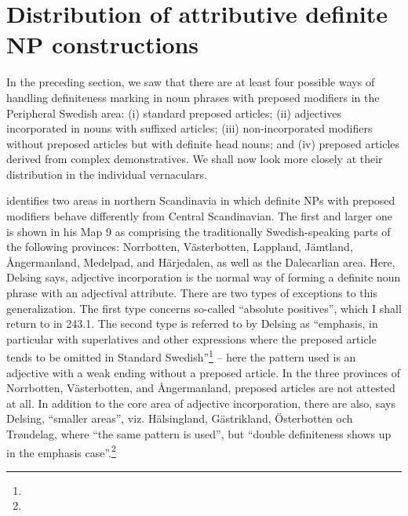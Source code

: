 \section{\rmfamily\bfseries Distribution of attributive definite NP constructions}
\label{bkm:Ref141070030}
\begin{styleBodyTextFirst}
In the preceding section, we saw that there are at least four possible ways of handling definiteness marking in noun phrases with preposed modifiers in the Peripheral Swedish area: (i) standard preposed articles; (ii) adjectives incorporated in nouns with suffixed articles; (iii) non-incorporated modifiers without preposed articles but with definite head nouns; and (iv) preposed articles derived from complex demonstratives.  We shall now look more closely at their distribution in the individual vernaculars. 

\end{styleBodyTextFirst}

\begin{styleBodytextC}
\citet[49]{Delsing2003a} identifies two areas in northern Scandinavia in which definite NPs with preposed modifiers behave differently from Central Scandinavian. The first and larger one is shown in his Map 9 as comprising the traditionally Swedish-speaking parts of the following provinces: Norrbotten, Västerbotten, Lappland, Jämtland, Ångermanland, Medelpad, and Härjedalen, as well as the Dalecarlian area. Here, Delsing says, adjective incorporation is the normal way of forming a definite noun phrase with an adjectival attribute. There are two types of exceptions to this generalization. The first type concerns so-called “absolute positives”, which I shall return to in 243.1. The second type is referred to by Delsing as “emphasis, in particular with superlatives and other expressions where the preposed article tends to be omitted in Standard Swedish”\footnote{} – here the pattern used is an adjective with a weak ending without a preposed article. In the three provinces of Norrbotten, Västerbotten, and Ångermanland, preposed articles are not attested at all. In addition to the core area of adjective incorporation, there are also, says Delsing, “smaller areas”, viz. Hälsingland, Gästrikland, Österbotten och Trøndelag, where “the same pattern is used”, but “double definiteness shows up in the emphasis case”.\footnote{}

\end{styleBodytextC}

